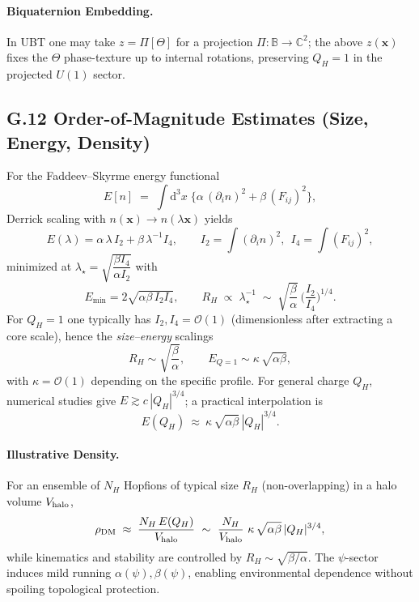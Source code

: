 \documentclass[12pt,a4paper]{article}
\numberwithin{equation}{section}
\theoremstyle{definition}
\theoremstyle{remark}
\begin{document}
\paragraph{Biquaternion Embedding.} In UBT one may take $z=\Pi[\Theta]$ for a projection $\Pi:\mathbb{B}\!\to\!\mathbb{C}^2$; the above $z(\mathbf{x})$ fixes the $\Theta$ phase-texture up to internal rotations, preserving $Q_H=1$ in the projected $U(1)$ sector.

\subsection*{G.12 Order-of-Magnitude Estimates (Size, Energy, Density)}
For the Faddeev--Skyrme energy functional
\begin{equation}
E[n] \;=\; \int\!\mathrm{d}^3x\;\Big\{\alpha\, (\partial_i n)^2 + \beta\, (F_{ij})^2\Big\},
\end{equation}
Derrick scaling with $n(\mathbf{x})\to n(\lambda \mathbf{x})$ yields
\begin{equation}
E(\lambda)= \alpha\, \lambda\, I_2 + \beta\, \lambda^{-1} I_4,\qquad
I_2=\!\int\! (\partial_i n)^2,\ \ I_4=\!\int\! (F_{ij})^2,
\end{equation}
minimized at $\lambda_\star=\sqrt{\dfrac{\beta I_4}{\alpha I_2}}$ with
\begin{equation}
E_{\min}=2\sqrt{\alpha\beta\, I_2 I_4},\qquad
R_H \;\propto\; \lambda_\star^{-1} \;\sim\; \sqrt{\frac{\beta}{\alpha}}\, \Big(\frac{I_2}{I_4}\Big)^{1/4}.
\end{equation}
For $Q_H=1$ one typically has $I_2,I_4=\mathcal{O}(1)$ (dimensionless after extracting a core scale), hence the \emph{size--energy} scalings
\begin{equation}
R_H \sim \sqrt{\frac{\beta}{\alpha}},\qquad E_{Q=1} \sim \kappa\, \sqrt{\alpha\beta},
\end{equation}
with $\kappa=\mathcal{O}(1)$ depending on the specific profile. For general charge $Q_H$, numerical studies give $E \gtrsim c\,|Q_H|^{3/4}$; a practical interpolation is
\begin{equation}
E(Q_H)\ \approx\ \kappa\, \sqrt{\alpha\beta}\, |Q_H|^{3/4}.
\end{equation}
\paragraph{Illustrative Density.} For an ensemble of $N_H$ Hopfions of typical size $R_H$ (non-overlapping) in a halo volume $V_{\rm halo}$,
\begin{equation}
\rho_{\rm DM} \;\approx\; \frac{N_H\, E(Q_H)}{V_{\rm halo}} \ \sim\  \frac{N_H}{V_{\rm halo}}\ \kappa\, \sqrt{\alpha\beta}\, |Q_H|^{3/4},
\end{equation}
while kinematics and stability are controlled by $R_H\!\sim\!\sqrt{\beta/\alpha}$. The $\psi$-sector induces mild running $\alpha(\psi),\beta(\psi)$, enabling environmental dependence without spoiling topological protection.
\end{document}

